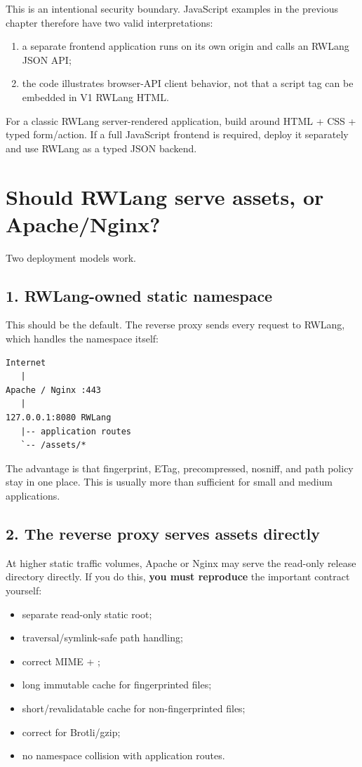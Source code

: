 This is an intentional security boundary. JavaScript  examples in the previous chapter therefore have two valid interpretations:

\begin{enumerate}
  \item a separate frontend application runs on its own origin and calls an RWLang JSON API;
  \item the code illustrates browser-API client behavior, not that a script tag can be embedded in V1 RWLang HTML.
\end{enumerate}

For a classic RWLang server-rendered application, build around HTML + CSS + typed form/action. If a full JavaScript frontend is required, deploy it separately and use RWLang as a typed JSON backend.

\section{Should RWLang serve assets, or Apache/Nginx?}

Two deployment models work.

\subsection*{1. RWLang-owned static namespace}

This should be the default. The reverse proxy sends every request to RWLang, which handles the  namespace itself:

\begin{lstlisting}
Internet
   |
Apache / Nginx :443
   |
127.0.0.1:8080 RWLang
   |-- application routes
   `-- /assets/*
\end{lstlisting}

The advantage is that fingerprint, ETag, precompressed, nosniff, and path policy stay in one place. This is usually more than sufficient for small and medium applications.

\subsection*{2. The reverse proxy serves assets directly}

At higher static traffic volumes, Apache or Nginx may serve the read-only release  directory directly. If you do this, \textbf{you must reproduce} the important contract yourself:

\begin{itemize}
  \item separate read-only static root;
  \item traversal/symlink-safe path handling;
  \item correct MIME + ;
  \item long immutable cache for fingerprinted files;
  \item short/revalidatable cache for non-fingerprinted files;
  \item correct  for Brotli/gzip;
  \item no namespace collision with application routes.
\end{itemize}

